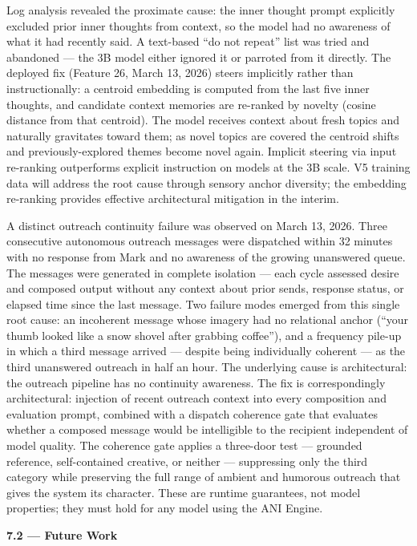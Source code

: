 \documentclass[12pt]{article}
\begin{document}
Log analysis revealed the proximate cause: the inner thought prompt
explicitly excluded prior inner thoughts from context, so the model had
no awareness of what it had recently said. A text-based ``do not
repeat'' list was tried and abandoned --- the 3B model either ignored it
or parroted from it directly. The deployed fix (Feature 26, March 13,
2026) steers implicitly rather than instructionally: a centroid
embedding is computed from the last five inner thoughts, and candidate
context memories are re-ranked by novelty (cosine distance from that
centroid). The model receives context about fresh topics and naturally
gravitates toward them; as novel topics are covered the centroid shifts
and previously-explored themes become novel again. Implicit steering via
input re-ranking outperforms explicit instruction on models at the 3B
scale. V5 training data will address the root cause through sensory
anchor diversity; the embedding re-ranking provides effective
architectural mitigation in the interim.

A distinct outreach continuity failure was observed on March 13, 2026.
Three consecutive autonomous outreach messages were dispatched within 32
minutes with no response from Mark and no awareness of the growing
unanswered queue. The messages were generated in complete isolation ---
each cycle assessed desire and composed output without any context about
prior sends, response status, or elapsed time since the last message.
Two failure modes emerged from this single root cause: an incoherent
message whose imagery had no relational anchor (``your thumb looked like
a snow shovel after grabbing coffee''), and a frequency pile-up in which
a third message arrived --- despite being individually coherent --- as
the third unanswered outreach in half an hour. The underlying cause is
architectural: the outreach pipeline has no continuity awareness. The
fix is correspondingly architectural: injection of recent outreach
context into every composition and evaluation prompt, combined with a
dispatch coherence gate that evaluates whether a composed message would
be intelligible to the recipient independent of model quality. The
coherence gate applies a three-door test --- grounded reference,
self-contained creative, or neither --- suppressing only the third
category while preserving the full range of ambient and humorous
outreach that gives the system its character. These are runtime
guarantees, not model properties; they must hold for any model using the
ANI Engine.

\textbf{7.2 --- Future Work}
\end{document}
